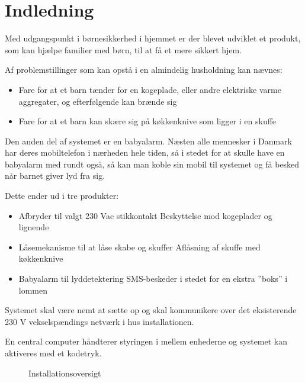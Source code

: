 \chapter{Indledning}

Med udgangspunkt i børnesikkerhed i hjemmet er der blevet udviklet et produkt, som kan hjælpe familier med børn, til at få et mere sikkert hjem.

Af problemstillinger som kan opstå i en almindelig husholdning kan nævnes:
\begin{itemize}
	\item Fare for at et barn tænder for en kogeplade, eller andre elektriske varme aggregater, og efterfølgende kan brænde sig
	\item Fare for at et barn kan skære sig på køkkenknive som ligger i en skuffe
\end{itemize}

Den anden del af systemet er en babyalarm. Næsten alle mennesker i Danmark har deres mobiltelefon i nærheden hele tiden, så i stedet for at skulle have en babyalarm med rundt også, så kan man koble sin mobil til systemet og få besked når barnet giver lyd fra sig.

Dette ender ud i tre produkter:

\begin{itemize}
\item Afbryder til valgt 230 Vac stikkontakt
\subitem Beskyttelse mod kogeplader og lignende
\item Låsemekanisme til at låse skabe og skuffer
\subitem Aflåsning af skuffe med køkkenknive
\item Babyalarm til lyddetektering
\subitem SMS-beskeder i stedet for en ekstra ''boks'' i lommen
\end{itemize}

Systemet skal være nemt at sætte op og skal kommunikere over det eksisterende 230 V vekselspændings netværk i hus installationen.

En central computer håndterer styringen i mellem enhederne og systemet kan aktiveres med et kodetryk.

\newpage

\begin{figure}[h] \centering
{}
\caption{Installationsoversigt}
\label{fig:installationsoversigt}
\end{figure}

